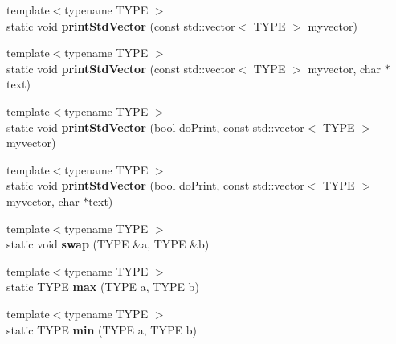 \begin{DoxyCompactItemize}
\item 
{\footnotesize template$<$typename T\+Y\+PE $>$ }\\static void {\bfseries print\+Std\+Vector} (const std\+::vector$<$ T\+Y\+PE $>$ myvector)\hypertarget{class_k_w_util_aaffd937290f71df67551a6f2a00e1660}{}\label{class_k_w_util_aaffd937290f71df67551a6f2a00e1660}

\item 
{\footnotesize template$<$typename T\+Y\+PE $>$ }\\static void {\bfseries print\+Std\+Vector} (const std\+::vector$<$ T\+Y\+PE $>$ myvector, char $\ast$text)\hypertarget{class_k_w_util_a8d69c11c8b97c2bc5aee5449ece9b11d}{}\label{class_k_w_util_a8d69c11c8b97c2bc5aee5449ece9b11d}

\item 
{\footnotesize template$<$typename T\+Y\+PE $>$ }\\static void {\bfseries print\+Std\+Vector} (bool do\+Print, const std\+::vector$<$ T\+Y\+PE $>$ myvector)\hypertarget{class_k_w_util_a684d6abf0326e8d495f709c2b1d82ea2}{}\label{class_k_w_util_a684d6abf0326e8d495f709c2b1d82ea2}

\item 
{\footnotesize template$<$typename T\+Y\+PE $>$ }\\static void {\bfseries print\+Std\+Vector} (bool do\+Print, const std\+::vector$<$ T\+Y\+PE $>$ myvector, char $\ast$text)\hypertarget{class_k_w_util_ac17252f672282e2f60e76d594ed2d8f7}{}\label{class_k_w_util_ac17252f672282e2f60e76d594ed2d8f7}

\item 
{\footnotesize template$<$typename T\+Y\+PE $>$ }\\static void {\bfseries swap} (T\+Y\+PE \&a, T\+Y\+PE \&b)\hypertarget{class_k_w_util_a6ed5d213169247c4b3fe3ed2fb96dd88}{}\label{class_k_w_util_a6ed5d213169247c4b3fe3ed2fb96dd88}

\item 
{\footnotesize template$<$typename T\+Y\+PE $>$ }\\static T\+Y\+PE {\bfseries max} (T\+Y\+PE a, T\+Y\+PE b)\hypertarget{class_k_w_util_a707d699ad01c87ba21e06fe28de85712}{}\label{class_k_w_util_a707d699ad01c87ba21e06fe28de85712}

\item 
{\footnotesize template$<$typename T\+Y\+PE $>$ }\\static T\+Y\+PE {\bfseries min} (T\+Y\+PE a, T\+Y\+PE b)\hypertarget{class_k_w_util_af1b3640361810ba75435a850d73a2413}{}\label{class_k_w_util_af1b3640361810ba75435a850d73a2413}


\end{DoxyCompactItemize}
